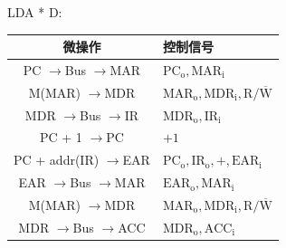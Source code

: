 \documentclass[UTF8]{report}
\newenvironment{solution}{{\noindent\hskip 2em \bf 解 \quad}}{}
\renewcommand{\to}{$\rightarrow$}
\begin{document}
\begin{solution}
        LDA * D:
        \begin{table}[htbp]
            \centering
            \begin{tabular}{cl}
                \toprule
                微操作 & 控制信号 \\
                \midrule
                PC \to Bus \to MAR        & $\mathrm{PC_o, MAR_i                   }$ \\
                M(MAR) \to MDR            & $\mathrm{MAR_o, MDR_i, R/\overline{W}  }$ \\
                MDR \to Bus \to IR        & $\mathrm{MDR_o, IR_i                   }$ \\
                PC + 1 \to PC             & $\mathrm{+1                            }$ \\
                \midrule
                PC + addr(IR) \to EAR     & $\mathrm{PC_o, IR_o, +, EAR_i          }$ \\
                EAR \to Bus \to MAR       & $\mathrm{EAR_o, MAR_i                  }$ \\
                M(MAR) \to MDR            & $\mathrm{MAR_o, MDR_i, R/\overline{W}  }$ \\
                MDR \to Bus \to ACC       & $\mathrm{MDR_o, ACC_i                  }$ \\
                \bottomrule
            \end{tabular}
        \end{table}
        

\end{solution}
\end{document}
